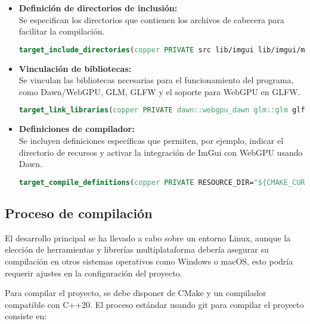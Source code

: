 \begin{itemize}
    \item \textbf{Definición de directorios de inclusión:}\\
          Se especifican los directorios que contienen los archivos de cabecera para facilitar la compilación.
          \begin{lstlisting}[language=CMake, caption={Definición de directorios de inclusión en CMakeLists.txt}]
    target_include_directories(copper PRIVATE src lib/imgui lib/imgui/misc/cpp lib/imgui/backends ${CMAKE_CURRENT_BINARY_DIR}/src)\end{lstlisting}

    \item \textbf{Vinculación de bibliotecas:}\\
          Se vinculan las bibliotecas necesarias para el funcionamiento del programa, como Dawn/WebGPU, GLM, GLFW y el soporte para WebGPU en GLFW.
          \begin{lstlisting}[language=CMake, caption={Vinculación de bibliotecas en CMakeLists.txt}]
    target_link_libraries(copper PRIVATE dawn::webgpu_dawn glm::glm glfw webgpu_glfw ImGuiFileDialog)\end{lstlisting}

    \item \textbf{Definiciones de compilador:}\\
          Se incluyen definiciones específicas que permiten, por ejemplo, indicar el directorio de recursos y activar la integración de ImGui con WebGPU usando Dawn.
          \begin{lstlisting}[language=CMake, caption={Definiciones de compilador en CMakeLists.txt}]
                target_compile_definitions(copper PRIVATE RESOURCE_DIR="${CMAKE_CURRENT_SOURCE_DIR}/src" IMGUI_IMPL_WEBGPU_BACKEND_DAWN)
\end{lstlisting}
\end{itemize}

\subsection{Proceso de compilación}

El desarrollo principal se ha llevado a cabo sobre un entorno Linux, aunque la
elección de herramientas y librerías multiplataforma debería asegurar su compilación en
otros sistemas operativos como Windows o macOS, esto podría requerir ajustes en
la configuración del proyecto.

Para compilar el proyecto, se debe disponer de CMake y un compilador compatible
con C++20. El proceso estándar usando git para compilar el proyecto consiste
en:

